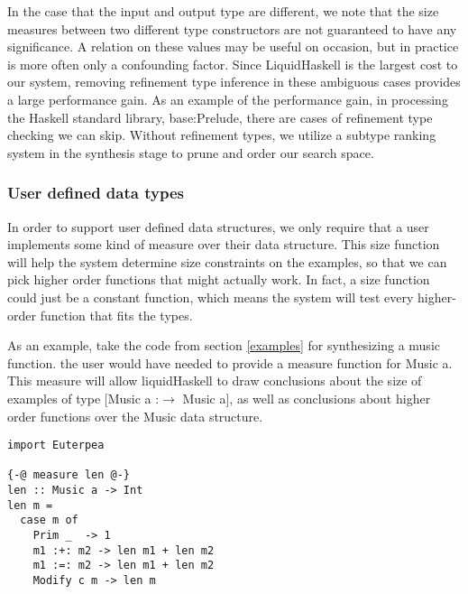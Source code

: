 In the case that the input and output type are different, we note that the size measures between two different type constructors are not guaranteed to have any significance.
A relation on these values may be useful on occasion, but in practice is more often only a confounding factor.
Since LiquidHaskell is the largest cost to our system, removing refinement type inference in these ambiguous cases provides a large performance gain.
As an example of the performance gain, in processing the Haskell standard library, base:Prelude, there are  cases of refinement type checking we can skip.
Without refinement types, we utilize a subtype ranking system in the synthesis stage to prune and order our search space.


\subsubsection{User defined data types}
In order to support user defined data structures, we only require that a user implements some kind of measure\cite{realWorldLiquid} over their data structure.
This size function will help the system determine size constraints on the examples, so that we can pick higher order functions that might actually work.
In fact, a size function could just be a constant function, which means the system will test every higher-order function that fits the types. 

As an example, take the code from section \ref{examples} for synthesizing a music function.
the user would have needed to provide a measure function for Music a.
This measure will allow liquidHaskell to draw conclusions about the size of examples of type [Music a :$\to$ Music a], as well as conclusions about higher order functions over the Music data structure.

\begin{lstlisting}
import Euterpea

{-@ measure len @-}
len :: Music a -> Int
len m =
  case m of
    Prim _  -> 1
    m1 :+: m2 -> len m1 + len m2
    m1 :=: m2 -> len m1 + len m2
    Modify c m -> len m
\end{lstlisting}



